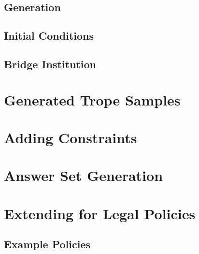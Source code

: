\subsection{Generation}

\subsection{Initial Conditions}

\subsection{Bridge Institution}

\section{Generated Trope Samples}
\label{sec:t-tropes}


\section{Adding Constraints}
\label{sec:t-constraints}

\section{Answer Set Generation}
\label{sec:t-asp}

\section{Extending for Legal Policies}
\label{sec:t-legal}

\subsection{Example Policies}

